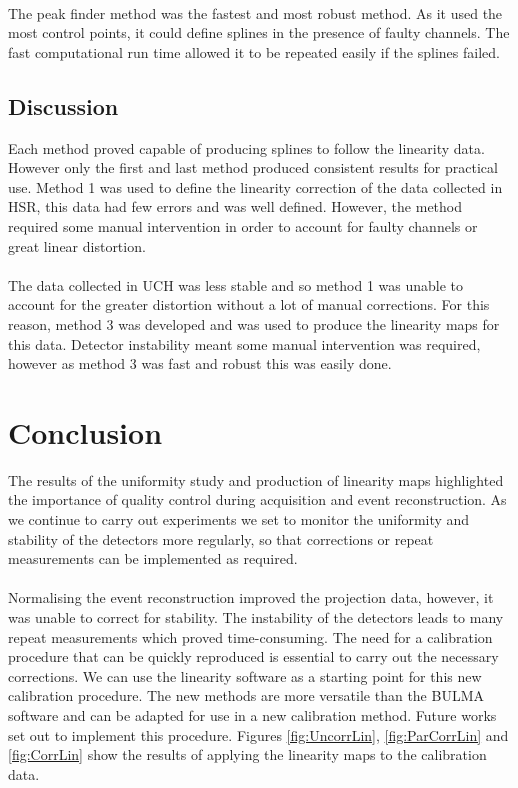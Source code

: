 \paragraph{}
The peak finder method was the fastest and most robust method. As it used the most control points, it could define splines in the presence of faulty channels. The fast computational run time allowed it to be repeated easily if the splines failed. 

\subsection{Discussion}
Each method proved capable of producing splines to follow the linearity data. However only the first and last method produced consistent results for practical use. Method 1 was used to define the linearity correction of the data collected in \acrshort{HSR}, this data had few errors and was well defined. However, the method required some manual intervention in order to account for faulty channels or great linear distortion. 
\paragraph{}
The data collected in \acrshort{UCH} was less stable and so method 1 was unable to account for the greater distortion without a lot of manual corrections. For this reason, method 3 was developed and was used to produce the linearity maps for this data. Detector instability meant some manual intervention was required, however as method 3 was fast and robust this was easily done. 
\section{Conclusion}
The results of the uniformity study and production of linearity maps highlighted the importance of quality control during acquisition and event reconstruction. As we continue to carry out experiments we set to monitor the uniformity and stability of the detectors more regularly, so that corrections or repeat measurements can be implemented as required.
\paragraph{}
Normalising the event reconstruction improved the projection data, however, it was unable to correct for stability. The instability of the detectors leads to many repeat measurements which proved time-consuming. The need for a calibration procedure that can be quickly reproduced is essential to carry out the necessary corrections. We can use the linearity software as a starting point for this new calibration procedure. The new methods are more versatile than the BULMA software and can be adapted for use in a new calibration method. Future works set out to implement this procedure. Figures \ref{fig:UncorrLin}, \ref{fig:ParCorrLin} and \ref{fig:CorrLin} show the results of applying the linearity maps to the calibration data. 

